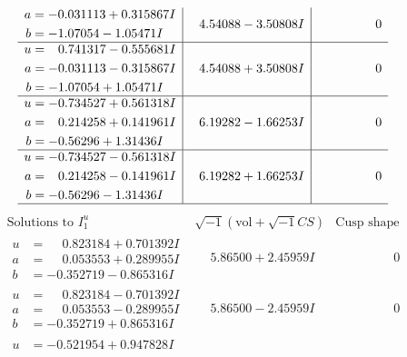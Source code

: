 \documentclass[1p]{elsarticle_modified}
\theoremstyle{definition}
\newcommand{\I}{\sqrt{-1}}
\begin{document}
$$\begin{array}{c|c|c}
\begin{aligned}
a &= -0.031113 + 0.315867 I \\
b &= -1.07054 - 1.05471 I\end{aligned}
 & \phantom{-}4.54088 - 3.50808 I & \phantom{-0.000000 } 0 \\ \hline\begin{aligned}
u &= \phantom{-}0.741317 - 0.555681 I \\
a &= -0.031113 - 0.315867 I \\
b &= -1.07054 + 1.05471 I\end{aligned}
 & \phantom{-}4.54088 + 3.50808 I & \phantom{-0.000000 } 0 \\ \hline\begin{aligned}
u &= -0.734527 + 0.561318 I \\
a &= \phantom{-}0.214258 + 0.141961 I \\
b &= -0.56296 + 1.31436 I\end{aligned}
 & \phantom{-}6.19282 - 1.66253 I & \phantom{-0.000000 } 0 \\ \hline\begin{aligned}
u &= -0.734527 - 0.561318 I \\
a &= \phantom{-}0.214258 - 0.141961 I \\
b &= -0.56296 - 1.31436 I\end{aligned}
 & \phantom{-}6.19282 + 1.66253 I & \phantom{-0.000000 } 0\\
 \hline 
 \end{array}$$\newpage$$\begin{array}{c|c|c}  
\text{Solutions to }I^u_{1}& \I (\text{vol} + \sqrt{-1}CS) & \text{Cusp shape}\\
 \hline 
\begin{aligned}
u &= \phantom{-}0.823184 + 0.701392 I \\
a &= \phantom{-}0.053553 + 0.289955 I \\
b &= -0.352719 - 0.865316 I\end{aligned}
 & \phantom{-}5.86500 + 2.45959 I & \phantom{-0.000000 } 0 \\ \hline\begin{aligned}
u &= \phantom{-}0.823184 - 0.701392 I \\
a &= \phantom{-}0.053553 - 0.289955 I \\
b &= -0.352719 + 0.865316 I\end{aligned}
 & \phantom{-}5.86500 - 2.45959 I & \phantom{-0.000000 } 0 \\ \hline\begin{aligned}
u &= -0.521954 + 0.947828 I \\

\end{aligned}
\end{array}$$
\end{document}
